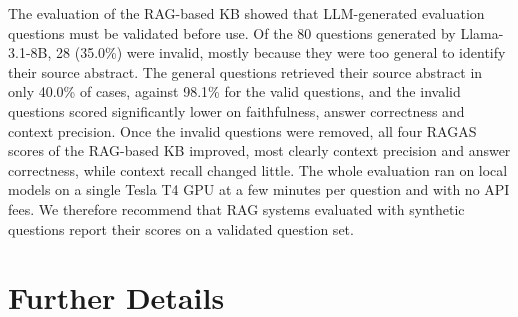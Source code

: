 \documentclass[bdcc,article,submit,pdftex,moreauthors]{Definitions/mdpi}
\begin{document}
The evaluation of the RAG-based KB showed that LLM-generated evaluation questions must be validated before use. Of the 80 questions generated by Llama-3.1-8B, 28 (35.0\%) were invalid, mostly because they were too general to identify their source abstract. The general questions retrieved their source abstract in only 40.0\% of cases, against 98.1\% for the valid questions, and the invalid questions scored significantly lower on faithfulness, answer correctness and context precision. Once the invalid questions were removed, all four RAGAS scores of the RAG-based KB improved, most clearly context precision and answer correctness, while context recall changed little. The whole evaluation ran on local models on a single Tesla T4 GPU at a few minutes per question and with no API fees. We therefore recommend that RAG systems evaluated with synthetic questions report their scores on a validated question set.

\section{Further Details}


\end{document}
